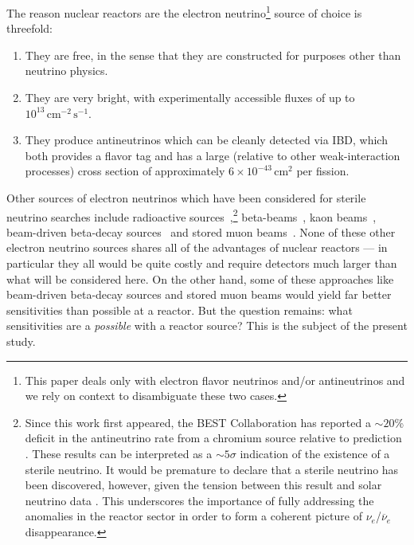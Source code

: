 \documentclass[prd, twocolumn, tightenlines, twoside, secnumarabic, superscriptaddress, preprintnumbers, nofootinbib, notitlepage]{revtex4-1}
\begin{document}
The reason nuclear reactors are the electron neutrino\footnote{This paper deals only with electron flavor neutrinos and/or antineutrinos and we rely on context to disambiguate these two cases.} source of choice is threefold: 
\begin{enumerate}
    \item They are free, in the sense that they are constructed for purposes other than neutrino physics.
    \item They are very bright, with experimentally accessible fluxes of up to $10^{13}\,\mathrm{cm}^{-2}\,\mathrm{s}^{-1}$.
    \item They produce antineutrinos which can be cleanly detected via IBD, which both provides a flavor tag and has a large (relative to other weak-interaction processes) cross section of approximately $6\times10^{-43}\,\mathrm{cm}^2$ per fission.
    \end{enumerate}
Other sources of electron neutrinos which have been considered for sterile neutrino searches include radioactive sources~\cite{GALLEX:1994rym, Abdurashitov:1996dp, GALLEX:1997lja, SAGE:1998fvr, Abdurashitov:2005tb, Grieb:2006mp, Kaether:2010ag, Borexino:2013xxa},\footnote{Since this work first appeared, the BEST Collaboration has reported a $\sim20$\% deficit in the antineutrino rate from a chromium source relative to prediction \cite{Barinov:2021asz}. These results can be interpreted \cite{Barinov:2021mjj} as a $\sim5\sigma$ indication of the existence of a sterile neutrino. It would be premature to declare that a sterile neutrino has been discovered, however, given the tension between this result and solar neutrino data \cite{Goldhagen:2021kxe}. This underscores the importance of fully addressing the anomalies in the reactor sector in order to form a coherent picture of $\nu_e$/$\overline{\nu}_e$ disappearance.} beta-beams~\cite{NeutrinoFactory:2004odt, Agarwalla:2009em}, kaon beams~\cite{Delgadillo:2020uvm}, beam-driven beta-decay sources~\cite{Conrad:2013sqa} and stored muon beams~\cite{Adey:2014rfv}. None of these other electron neutrino sources shares all of the advantages of nuclear reactors --- in particular they all would be quite costly and require detectors much larger than what will be considered here. On the other hand, some of these approaches like beam-driven beta-decay sources and stored muon beams would yield far better sensitivities than possible at a reactor. But the question remains: what sensitivities are a \emph{possible} with a reactor source? This is the subject of the present study.
\end{document}
